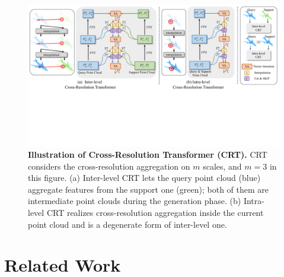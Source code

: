 \documentclass[letterpaper]{article} %
\begin{document}
\begin{figure}[t]
\begin{center}
\includegraphics[width=1.0\linewidth]{Figures/crt.pdf}
\end{center}
\caption{
{\bf Illustration of Cross-Resolution Transformer (CRT).}
CRT considers the cross-resolution aggregation on $m$ scales, and $m=3$ in this figure.
(a) Inter-level CRT lets the query point cloud (blue) aggregate features from the support one (green); both of them are intermediate point clouds during the generation phase.
(b) Intra-level CRT realizes cross-resolution aggregation inside the current point cloud and is a degenerate form of inter-level one.}
\label{fig:crt}
\end{figure}



\section{Related Work} \label{sec:rw}
\end{document}
